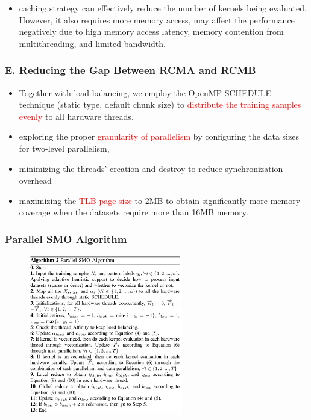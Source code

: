\documentclass{beamer}
\begin{document}
\begin{frame}
\begin{columns}[c]
	\end{columns}	
		\begin{itemize}
			\item caching strategy can
			effectively reduce the number of kernels being evaluated. However,
			it also requires more memory access, may affect the performance negatively due to high memory
			access latency, memory contention from multithreading, and limited
			bandwidth. 			
		\end{itemize}		
\end{frame}

\begin{frame}
	\frametitle{E. Reducing the Gap Between RCMA and RCMB}
	\begin{itemize}
		\item Together with load balancing, we employ the
		OpenMP SCHEDULE technique (static type, default chunk size)
		to \textcolor{red}{distribute the training samples evenly} to all hardware threads. 
		\item exploring the proper \textcolor{red}{granularity of
		parallelism} by configuring the data sizes for two-level parallelism,
		\item minimizing the threads’ creation and destroy to reduce synchronization overhead
		\item maximizing the \textcolor{red}{TLB page size} to 2MB to obtain
		significantly more memory coverage when the datasets require more
		than 16MB memory.	
		 			
	\end{itemize}		
\end{frame}

\begin{frame}
	\frametitle{Parallel SMO Algorithm}	
	\begin{figure}
		\includegraphics[width=0.6\textwidth]{fig/smo_parallelalgo.png}
	\end{figure} 
\end{frame}
\end{document}
